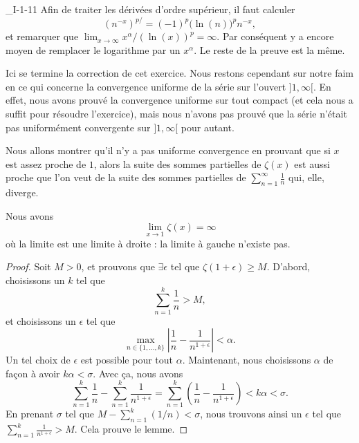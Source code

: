 \begin{corrige}{_I-1-11}
Afin de traiter les dérivées d'ordre supérieur, il faut calculer 
\begin{equation}
	(n^{-x})^{p/}=(-1)^p\big( \ln(n) \big)^p n^{-x},
\end{equation}
et remarquer que $\lim_{x\to\infty} x^{\alpha}/(\ln(x))^p=\infty$. Par conséquent y a encore moyen de remplacer le logarithme par un $x^{\alpha}$. Le reste de la preuve est la même.

Ici se termine la correction de cet exercice. Nous restons cependant sur notre faim en ce qui concerne la convergence uniforme de la série sur l'ouvert $]1,\infty[$. En effet, nous avons prouvé la convergence uniforme sur tout compact (et cela nous a suffit pour résoudre l'exercice), mais nous n'avons pas prouvé que la série n'était pas uniformément convergente sur $]1,\infty[$ pour autant.

Nous allons montrer qu'il n'y a pas uniforme convergence en prouvant que si $x$ est assez proche de $1$, alors la suite des sommes partielles de $\zeta(x)$ est aussi proche que l'on veut de la suite des sommes partielles de $\sum_{n=1}^{\infty}\frac{1}{ n }$ qui, elle, diverge. 

\begin{lemma}
Nous avons
\begin{equation}
	\lim_{x\to 1}\zeta(x)=\infty
\end{equation}
où la limite est une limite à droite : la limite à gauche n'existe pas.
\end{lemma}

\begin{proof}
Soit $M>0$, et prouvons que $\exists\epsilon$ tel que $\zeta(1+\epsilon)\geq M$. D'abord, choisissons un $k$ tel que 
\begin{equation}
	\sum_{n=1}^k\frac{1}{ n }>M,
\end{equation}
et choisissons un $\epsilon$ tel que
\begin{equation}
	\max_{n\in\{ 1,\ldots,k \}}\left|  \frac{1}{ n }-\frac{1}{ n^{1+\epsilon} }\right|<\alpha.
\end{equation}
Un tel choix de $\epsilon$ est possible pour tout $\alpha$. Maintenant, nous choisissons $\alpha$ de façon à avoir $k\alpha<\sigma$. Avec ça, nous avons
\begin{equation}
	\sum_{n=1}^k\frac{1}{ n }-\sum_{n=1}^k\frac{1}{ n^{1+\epsilon} }=\sum_{n=1}^k\left( \frac{1}{ n }-\frac{1}{ n^{1+\epsilon} } \right)<k\alpha<\sigma.
\end{equation}
En prenant $\sigma$ tel que $M-\sum_{n=1}^k(1/n)<\sigma$, nous trouvons ainsi un $\epsilon$ tel que $\sum_{n=1}^k\frac{1}{ n^{1+\epsilon} }>M$. Cela prouve le lemme.
\end{proof}


\end{corrige}
